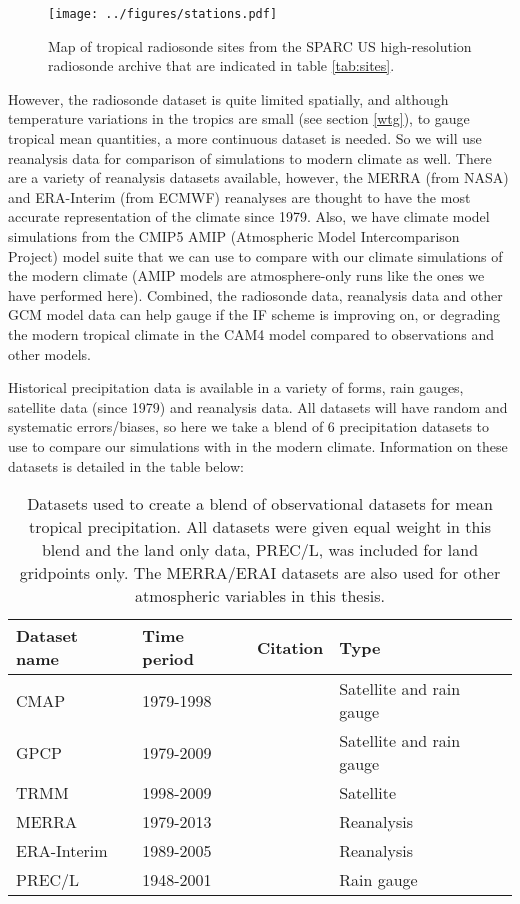 \documentclass[letterpaper,12pt,titlepage,oneside,final]{book}
\begin{document}
\begin{figure}[H]
\centering
\noindent\texttt{[image: ../figures/stations.pdf]}\hfill
\caption{Map of tropical radiosonde sites from the SPARC US high-resolution radiosonde archive that are indicated in table \ref{tab:sites}.}
\label{fig:stations}
\end{figure}

However, the radiosonde dataset is quite limited spatially, and although temperature variations in the tropics are small (see section \ref{wtg}), to gauge tropical mean quantities, a more continuous dataset is needed. So we will use reanalysis data for comparison of simulations to modern climate as well. There are a variety of reanalysis datasets available, however, the MERRA (from NASA) and ERA-Interim (from ECMWF) reanalyses are thought to have the most accurate representation of the climate since 1979. Also, we have climate model simulations from the CMIP5 AMIP (Atmospheric Model Intercomparison Project) model suite \citep{taylor_overview_2011} that we can use to compare with our climate simulations of the modern climate (AMIP models are atmosphere-only runs like the ones we have performed here). Combined, the radiosonde data, reanalysis data and other GCM model data can help gauge if the IF scheme is improving on, or degrading the modern tropical climate in the CAM4 model compared to observations and other models.

Historical precipitation data is available in a variety of forms, rain gauges, satellite data (since 1979) and reanalysis data. All datasets will have random and systematic errors/biases, so here we take a blend of 6 precipitation datasets to use to compare our simulations with in the modern climate. Information on these datasets is detailed in the table below:

\begin{table}[H]
\caption{Datasets used to create a blend of observational datasets for mean tropical precipitation. All datasets were given equal weight in this blend and the land only data, PREC/L, was included for land gridpoints only. The MERRA/ERAI datasets are also used for other atmospheric variables in this thesis.}
\label{tab:precip}
\begin{tabular}{|p{2.75cm}||p{2cm}|p{4cm}|p{4cm}|}
\hline
Dataset name&Time period&Citation&Type\\ \hline
CMAP&1979-1998&\text{\citep{xie_global_1997}}&Satellite and rain gauge\\   \hline
GPCP&1979-2009&\text{\citep{adler_version-2_2003}}&Satellite and rain gauge\\ \hline
TRMM&1998-2009&\text{\citep{liu_tropical_2012}}&Satellite\\ \hline
MERRA&1979-2013&\text{\citep{rienecker_merra:_2011}}&Reanalysis\\ \hline
ERA-Interim&1989-2005&\text{\citep{dee_era-interim_2011}}&Reanalysis\\ \hline
PREC/L&1948-2001&\text{\citep{chen_global_2002}}&Rain gauge\\ \hline
\end{tabular}
\end{table}
\end{document}
